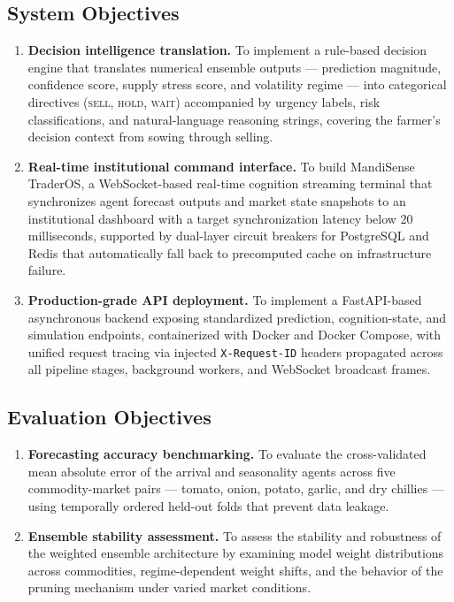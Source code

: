 \documentclass[12pt,a4paper]{report}
\begin{document}
\subsection{System Objectives}

\begin{enumerate}[resume]

    \item \textbf{Decision intelligence translation.} To implement a rule-based decision engine that translates numerical ensemble outputs — prediction magnitude, confidence score, supply stress score, and volatility regime — into categorical directives (\textsc{sell}, \textsc{hold}, \textsc{wait}) accompanied by urgency labels, risk classifications, and natural-language reasoning strings, covering the farmer's decision context from sowing through selling.

    \item \textbf{Real-time institutional command interface.} To build MandiSense TraderOS, a WebSocket-based real-time cognition streaming terminal that synchronizes agent forecast outputs and market state snapshots to an institutional dashboard with a target synchronization latency below 20 milliseconds, supported by dual-layer circuit breakers for PostgreSQL and Redis that automatically fall back to precomputed cache on infrastructure failure.

    \item \textbf{Production-grade API deployment.} To implement a FastAPI-based asynchronous backend exposing standardized prediction, cognition-state, and simulation endpoints, containerized with Docker and Docker Compose, with unified request tracing via injected \texttt{X-Request-ID} headers propagated across all pipeline stages, background workers, and WebSocket broadcast frames.

\end{enumerate}

\subsection{Evaluation Objectives}

\begin{enumerate}[resume]

    \item \textbf{Forecasting accuracy benchmarking.} To evaluate the cross-validated mean absolute error of the arrival and seasonality agents across five commodity-market pairs — tomato, onion, potato, garlic, and dry chillies — using temporally ordered held-out folds that prevent data leakage.

    \item \textbf{Ensemble stability assessment.} To assess the stability and robustness of the weighted ensemble architecture by examining model weight distributions across commodities, regime-dependent weight shifts, and the behavior of the pruning mechanism under varied market conditions.

\end{enumerate}
\end{document}
